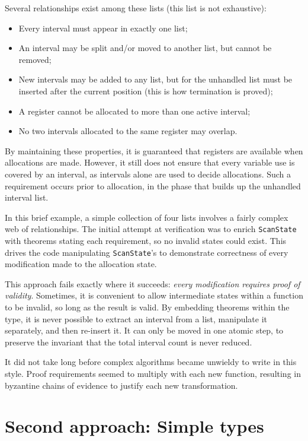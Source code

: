 \documentclass[preprint]{sigplanconf}
\begin{document}
Several relationships exist among these lists (this list is not exhaustive):

\begin{itemize}
\item Every interval must appear in exactly one list;
\item An interval may be split and/or moved to another list, but cannot be
  removed;
\item New intervals may be added to any list, but for the unhandled list must
  be inserted after the current position (this is how termination is proved);
\item A register cannot be allocated to more than one active interval;
\item No two intervals allocated to the same register may overlap.
\end{itemize}

By maintaining these properties, it is guaranteed that registers are available
when allocations are made. However, it still does not ensure that every
variable use is covered by an interval, as intervals alone are used to decide
allocations. Such a requirement occurs prior to allocation, in the phase that
builds up the unhandled interval list.

In this brief example, a simple collection of four lists involves a fairly
complex web of relationships. The initial attempt at verification was to
enrich \verb|ScanState| with theorems stating each requirement, so no invalid
states could exist. This drives the code manipulating \verb|ScanState|'s to
demonstrate correctness of every modification made to the allocation state.

This approach fails exactly where it succeeds: \emph{every modification
  requires proof of validity}. Sometimes, it is convenient to allow
intermediate states within a function to be invalid, so long as the result is
valid. By embedding theorems within the type, it is never possible to extract
an interval from a list, manipulate it separately, and then re-insert it. It
can only be moved in one atomic step, to preserve the invariant that the total
interval count is never reduced.

It did not take long before complex algorithms became unwieldy to write in
this style. Proof requirements seemed to multiply with each new function,
resulting in byzantine chains of evidence to justify each new transformation.

\section{Second approach: Simple types}
\end{document}
